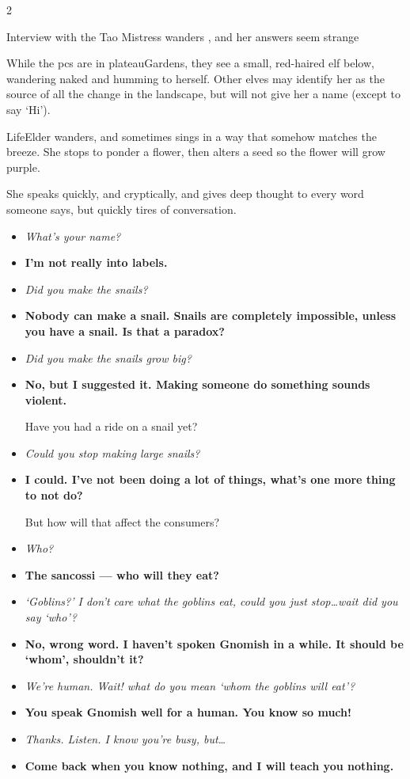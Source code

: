 \begin{multicols}{2}

\showStdSpells

{Interview with the Tao Mistress}%
{ wanders , and her answers seem strange}%

While the \glspl{pc} are in \gls{plateauGardens}, they see a small, red-haired elf below, wandering naked and humming to herself.
Other elves may identify her as the source of all the change in the landscape, but will not give her a name (except to say `Hi').

\Gls{LifeElder} wanders, and sometimes sings in a way that somehow matches the breeze.
She stops to ponder a flower, then alters a seed so the flower will grow purple.

She speaks quickly, and cryptically, and gives deep thought to every word someone says, but quickly tires of conversation.

\begin{itemize}
  \item\it
  What's your name?
  \item[\adforn{54}]\bf
  I'm not really into labels.
  \item\it
  Did you make the snails?
  \item[\adforn{54}]\bf
  Nobody can make a snail.
  Snails are completely impossible, unless you have a snail.
  Is that a paradox?
  \item\it
  Did you make the snails grow big?
  \item[\adforn{54}]\bf
  No, but I suggested it.
  Making someone do something sounds violent.

  Have you had a ride on a snail yet?
  \item\it
  Could you stop making large snails?
  \item[\adforn{54}]\bf
  I could.
  I've not been doing a lot of things, what's one more thing to not do?

  But how will that affect the \glspl{consumer}?
  \item\it
  Who?
  \item[\adforn{54}]\bf
  The sancossi --- who will they eat?
  \item\it
  `Goblins?'
  I don't care what the goblins eat, could you just stop\ldots wait did you say `who'?
  \item[\adforn{54}]\bf
  No, wrong word.
  I haven't spoken Gnomish in a while.
  It should be `whom', shouldn't it?
  \item\it
  We're human.
  Wait! what do you mean `whom the goblins will eat'?
  \item[\adforn{54}]\bf
  You speak Gnomish well for a human.
  You know so much!
  \item\it
  Thanks.
  Listen.
  I know you're busy, but\ldots
  \item[\adforn{54}]\bf
  Come back when you know nothing, and I will teach you nothing.
\end{itemize}


\end{multicols}
